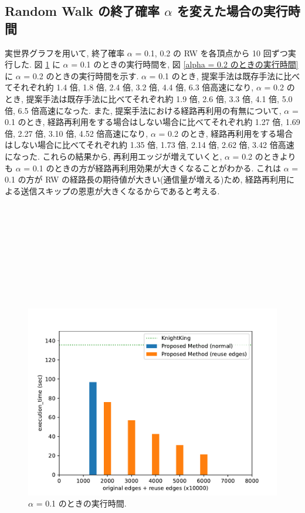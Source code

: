 \subsection{Random Walk の終了確率 $\alpha$ を変えた場合の実行時間}\label{終了確率 alpha を変えた場合の実行時間}

実世界グラフを用いて, 終了確率 $\alpha$ = 0.1, 0.2 の RW を各頂点から 10 回ずつ実行した. 図 \ref{alpha = 0.1 のときの実行時間} に $\alpha$ = 0.1 のときの実行時間を, 図 \ref{alpha = 0.2 のときの実行時間} に $\alpha$ = 0.2 のときの実行時間を示す. $\alpha$ = 0.1 のとき, 提案手法は既存手法に比べてそれぞれ約 1.4 倍, 1.8 倍, 2.4 倍, 3.2 倍, 4.4 倍, 6.3 倍高速になり, $\alpha$ = 0.2 のとき, 提案手法は既存手法に比べてそれぞれ約 1.9 倍, 2.6 倍, 3.3 倍, 4.1 倍, 5.0 倍, 6.5 倍高速になった. また, 提案手法における経路再利用の有無について, $\alpha$ = 0.1 のとき, 経路再利用をする場合はしない場合に比べてそれぞれ約 1.27 倍, 1.69 倍, 2.27 倍, 3.10 倍, 4.52 倍高速になり, $\alpha$ = 0.2 のとき, 経路再利用をする場合はしない場合に比べてそれぞれ約 1.35 倍, 1.73 倍, 2.14 倍, 2.62 倍, 3.42 倍高速になった. これらの結果から, 再利用エッジが増えていくと, $\alpha$ = 0.2 のときよりも $\alpha$ = 0.1 のときの方が経路再利用効果が大きくなることがわかる. これは $\alpha$ = 0.1 の方が RW の経路長の期待値が大きい(通信量が増える)ため, 経路再利用による送信スキップの恩恵が大きくなるからであると考える.
\\
\\
\\
\\
\\
\\
\\
\\
\\
\\

\begin{figure}[t]
    \centering
    \includegraphics[scale=0.8]{figure/AR_cache_alpha_0.1.pdf}
    \caption{$\alpha$ = 0.1 のときの実行時間.}
    \label{alpha = 0.1 のときの実行時間}
\end{figure}

